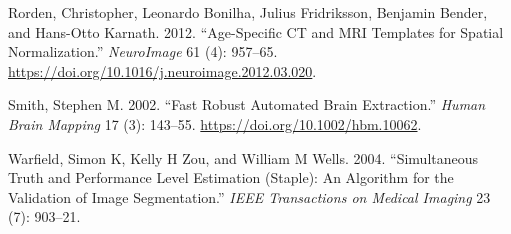 \documentclass[]{elsarticle} %
\newlength{\cslhangindent}
\newenvironment{cslreferences}%
  {\setlength{\parindent}{0pt}%
  \everypar{\setlength{\hangindent}{\cslhangindent}}\ignorespaces}%
  {\par}
\begin{document}
\begin{cslreferences}
\leavevmode\hypertarget{ref-rorden_age-specific_2012}{}%
Rorden, Christopher, Leonardo Bonilha, Julius Fridriksson, Benjamin Bender, and Hans-Otto Karnath. 2012. ``Age-Specific CT and MRI Templates for Spatial Normalization.'' \emph{NeuroImage} 61 (4): 957--65. \url{https://doi.org/10.1016/j.neuroimage.2012.03.020}.

\leavevmode\hypertarget{ref-smith_fast_2002}{}%
Smith, Stephen M. 2002. ``Fast Robust Automated Brain Extraction.'' \emph{Human Brain Mapping} 17 (3): 143--55. \url{https://doi.org/10.1002/hbm.10062}.

\leavevmode\hypertarget{ref-warfield2004simultaneous}{}%
Warfield, Simon K, Kelly H Zou, and William M Wells. 2004. ``Simultaneous Truth and Performance Level Estimation (Staple): An Algorithm for the Validation of Image Segmentation.'' \emph{IEEE Transactions on Medical Imaging} 23 (7): 903--21.
\end{cslreferences}
\end{document}
